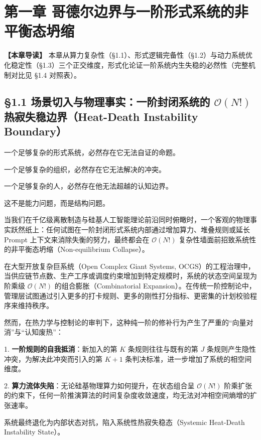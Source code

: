 \documentclass[11pt,a4paper,oneside]{ctexart}
\begin{document}
\section{第一章 哥德尔边界与一阶形式系统的非平衡态坍缩}

\begin{notebox}
\textbf{【本章导读】} 本章从算力复杂性（§1.1）、形式逻辑完备性（§1.2）与动力系统优化稳定性（§1.3）三个正交维度，形式化论证一阶系统内生失稳的必然性（完整机制对比见 §1.4 对照表）。
\end{notebox}

\subsection{§1.1 场景切入与物理事实：一阶封闭系统的 \texorpdfstring{$\mathcal{O}(N!)$}{O(N!)} 热寂失稳边界（Heat-Death Instability Boundary）}

一个足够复杂的形式系统，必然存在它无法自证的命题。

一个足够复杂的组织，必然存在它无法解决的冲突。

一个足够复杂的人，必然存在他无法超越的认知边界。


这不是能力问题，而是结构问题。


当我们在千亿级离散制造与硅基人工智能理论前沿同时俯瞰时，一个客观的物理事实跃然纸上：\textit{}任何试图在一阶封闭形式系统内部通过增加算力、堆叠规则或延长 Prompt 上下文来消除失衡的努力，最终都会在 $\mathcal{O}(N!)$ 复杂性墙面前招致系统性的非平衡态坍缩（Non-equilibrium Collapse）。\textit{}


在大型开放复杂巨系统（Open Complex Giant Systems, OCGS）的工程治理中，当供应链节点数、生产工序或调度约束增加到特定规模时，系统的状态空间呈现为阶乘级 $\mathcal{O}(N!)$ 的组合膨胀（Combinatorial Expansion）。在传统一阶控制论中，管理层试图通过引入更多的打卡规则、更多的刚性打分指标、更密集的计划校验程序来维持秩序。


然而，在热力学与控制论的审判下，这种纯一阶的修补行为产生了严重的“向量对消”与“认知废热”：

1. \textbf{一阶规则的自我抵消}：新加入的第 $K$ 条规则往往与既有的第 $J$ 条规则产生隐性冲突，为解决此冲突而引入的第 $K+1$ 条判决标准，进一步增加了系统的相空间维度。

2. \textbf{算力流体失陷}：无论硅基物理算力如何提升，在状态组合呈 $\mathcal{O}(N!)$ 阶乘扩张的约束下，任何一阶推演算法的时间复杂度收敛速度，均无法对冲相空间熵增的扩张速率。


系统最终退化为内部状态对抗，陷入系统性热寂失稳态（Systemic Heat-Death Instability State）。
\end{document}
